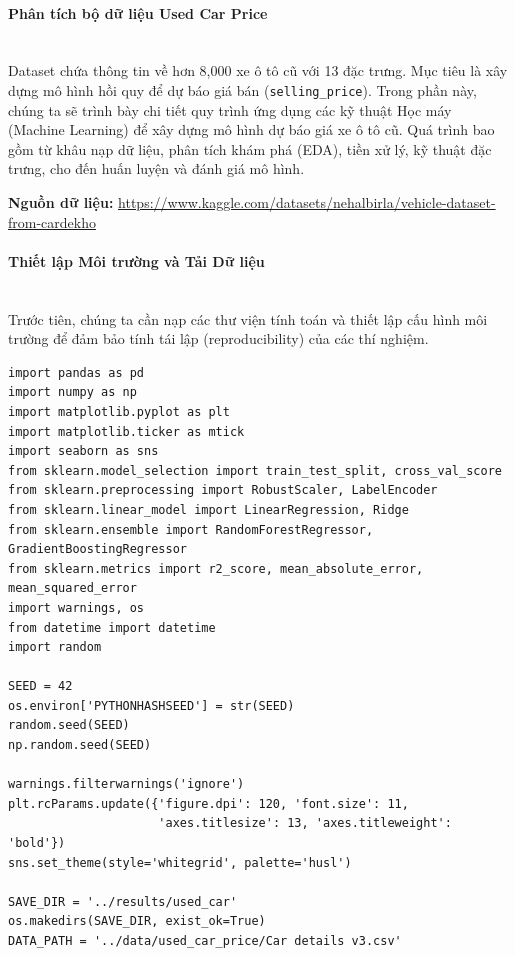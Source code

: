 \paragraph{Phân tích bộ dữ liệu Used Car Price} \hfill \\
Dataset chứa thông tin về hơn 8,000 xe ô tô cũ với 13 đặc trưng. Mục tiêu là xây dựng mô hình hồi quy để dự báo giá bán (\texttt{selling\_price}).
Trong phần này, chúng ta sẽ trình bày chi tiết quy trình ứng dụng các kỹ thuật Học máy (Machine Learning) để xây dựng mô hình dự báo giá xe ô tô cũ. Quá trình bao gồm từ khâu nạp dữ liệu, phân tích khám phá (EDA), tiền xử lý, kỹ thuật đặc trưng, cho đến huấn luyện và đánh giá mô hình.

\begin{center}
    \textbf{Nguồn dữ liệu:} \url{https://www.kaggle.com/datasets/nehalbirla/vehicle-dataset-from-cardekho}
\end{center}

\paragraph{Thiết lập Môi trường và Tải Dữ liệu} \hfill \\

Trước tiên, chúng ta cần nạp các thư viện tính toán và thiết lập cấu hình môi trường để đảm bảo tính tái lập (reproducibility) của các thí nghiệm.

\begin{lstlisting}[style=pythoncode, caption={Thiết lập môi trường và nạp thư viện}]
import pandas as pd
import numpy as np
import matplotlib.pyplot as plt
import matplotlib.ticker as mtick
import seaborn as sns
from sklearn.model_selection import train_test_split, cross_val_score
from sklearn.preprocessing import RobustScaler, LabelEncoder
from sklearn.linear_model import LinearRegression, Ridge
from sklearn.ensemble import RandomForestRegressor, GradientBoostingRegressor
from sklearn.metrics import r2_score, mean_absolute_error, mean_squared_error
import warnings, os
from datetime import datetime
import random

SEED = 42
os.environ['PYTHONHASHSEED'] = str(SEED)
random.seed(SEED)
np.random.seed(SEED)

warnings.filterwarnings('ignore')
plt.rcParams.update({'figure.dpi': 120, 'font.size': 11,
                     'axes.titlesize': 13, 'axes.titleweight': 'bold'})
sns.set_theme(style='whitegrid', palette='husl')

SAVE_DIR = '../results/used_car'
os.makedirs(SAVE_DIR, exist_ok=True)
DATA_PATH = '../data/used_car_price/Car details v3.csv'
\end{lstlisting}

